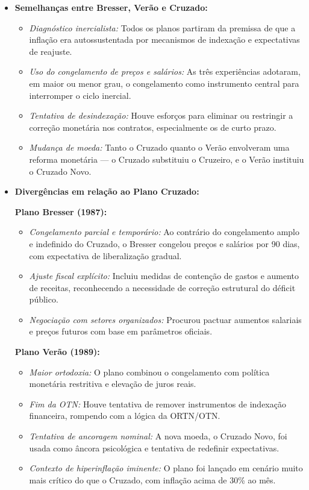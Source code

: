 \documentclass{sciposter}
\begin{document}
\begin{multicols}{3}
\begin{itemize}
    \item \textbf{ Semelhanças entre Bresser, Verão e Cruzado:}
    \begin{itemize}
        \item \textit{Diagnóstico inercialista:} Todos os planos partiram da premissa de que a inflação era autossustentada por mecanismos de indexação e expectativas de reajuste.
        \item \textit{Uso do congelamento de preços e salários:} As três experiências adotaram, em maior ou menor grau, o congelamento como instrumento central para interromper o ciclo inercial.
        \item \textit{Tentativa de desindexação:} Houve esforços para eliminar ou restringir a correção monetária nos contratos, especialmente os de curto prazo.
        \item \textit{Mudança de moeda:} Tanto o Cruzado quanto o Verão envolveram uma reforma monetária — o Cruzado substituiu o Cruzeiro, e o Verão instituiu o Cruzado Novo.
    \end{itemize}

    \item \textbf{ Divergências em relação ao Plano Cruzado:}

    \textbf{Plano Bresser (1987):}
    \begin{itemize}
        \item \textit{Congelamento parcial e temporário:} Ao contrário do congelamento amplo e indefinido do Cruzado, o Bresser congelou preços e salários por 90 dias, com expectativa de liberalização gradual.
        \item \textit{Ajuste fiscal explícito:} Incluiu medidas de contenção de gastos e aumento de receitas, reconhecendo a necessidade de correção estrutural do déficit público.
        \item \textit{Negociação com setores organizados:} Procurou pactuar aumentos salariais e preços futuros com base em parâmetros oficiais.
    \end{itemize}

    \textbf{Plano Verão (1989):}
    \begin{itemize}
        \item \textit{Maior ortodoxia:} O plano combinou o congelamento com política monetária restritiva e elevação de juros reais.
        \item \textit{Fim da OTN:} Houve tentativa de remover instrumentos de indexação financeira, rompendo com a lógica da ORTN/OTN.
        \item \textit{Tentativa de ancoragem nominal:} A nova moeda, o Cruzado Novo, foi usada como âncora psicológica e tentativa de redefinir expectativas.
        \item \textit{Contexto de hiperinflação iminente:} O plano foi lançado em cenário muito mais crítico do que o Cruzado, com inflação acima de 30\% ao mês.
    \end{itemize}


\end{itemize}
\end{multicols}
\end{document}
